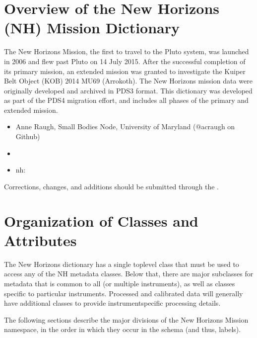 \documentclass[letterpaper,10pt,english]{sphinxmanual}
\begin{document}
\chapter{Overview of the New Horizons (NH) Mission Dictionary}
\label{\detokenize{user/user-guide:overview-of-the-new-horizons-nh-mission-dictionary}}
\sphinxAtStartPar
The New Horizons Mission, the first to travel to the Pluto system, was launched
in 2006 and flew past Pluto on 14 July 2015. After the successful completion of
its primary mission, an extended mission was granted to investigate the Kuiper
Belt Object (KOB) 2014 MU69 (Arrokoth). The New Horizons mission data were
originally developed and archived in PDS3 format. This dictionary was developed
as part of the PDS4 migration effort, and includes all phases of the primary and
extended mission.
\begin{itemize}
\item {} 
\sphinxAtStartPar
{} Anne Raugh, Small Bodies Node, University of Maryland (@acraugh on Github)

\item {} 
\sphinxAtStartPar
{} 

\item {} 
\sphinxAtStartPar
{} nh:

\end{itemize}

\sphinxAtStartPar
Corrections, changes, and additions should be submitted through
the .


\chapter{Organization of Classes and Attributes}
\label{\detokenize{user/user-guide:organization-of-classes-and-attributes}}
\sphinxAtStartPar
The New Horizons dictionary has a single top\sphinxhyphen{}level class that must be used to
access any of the NH metadata classes. Below that, there are major subclasses
for metadata that is common to all (or multiple instruments), as well as
classes specific to particular instruments. Processed and calibrated data will
generally have additional classes to provide instrument\sphinxhyphen{}specific processing
details.

\sphinxAtStartPar
The following sections describe the major divisions of the New Horizons Mission
namespace, in the order in which they occur in the schema (and thus, labels).
\end{document}

